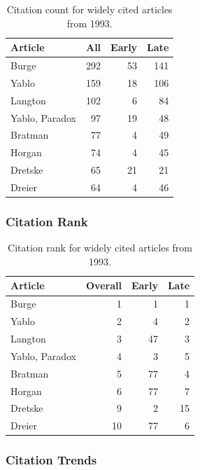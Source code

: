 \documentclass[
  10pt,
  letterpaper,
  DIV=11,
  numbers=noendperiod,
  twoside]{scrartcl}
\begin{document}
\begin{longtable}[]{@{}lrrr@{}}

\caption{\label{tbl-citation-count-1993}Citation count for widely cited
articles from 1993.}

\tabularnewline

\toprule\noalign{}
Article & All & Early & Late \\
\midrule\noalign{}
\endhead
\bottomrule\noalign{}
\endlastfoot
Burge & 292 & 53 & 141 \\
Yablo & 159 & 18 & 106 \\
Langton & 102 & 6 & 84 \\
Yablo, Paradox & 97 & 19 & 48 \\
Bratman & 77 & 4 & 49 \\
Horgan & 74 & 4 & 45 \\
Dretske & 65 & 21 & 21 \\
Dreier & 64 & 4 & 46 \\

\end{longtable}

\subsubsection*{Citation Rank}\label{sec-rank-1993}

\begin{longtable}[]{@{}lrrr@{}}

\caption{\label{tbl-citation-rank-1993}Citation rank for widely cited
articles from 1993.}

\tabularnewline

\toprule\noalign{}
Article & Overall & Early & Late \\
\midrule\noalign{}
\endhead
\bottomrule\noalign{}
\endlastfoot
Burge & 1 & 1 & 1 \\
Yablo & 2 & 4 & 2 \\
Langton & 3 & 47 & 3 \\
Yablo, Paradox & 4 & 3 & 5 \\
Bratman & 5 & 77 & 4 \\
Horgan & 6 & 77 & 7 \\
Dretske & 9 & 2 & 15 \\
Dreier & 10 & 77 & 6 \\

\end{longtable}

\subsubsection*{Citation Trends}\label{sec-trends-1993}
\end{document}
